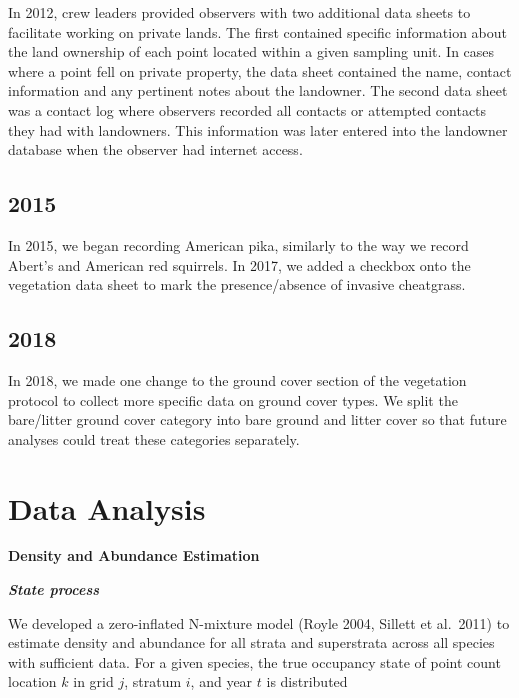 \documentclass[
  letterpaper,
  DIV=11,
  numbers=noendperiod,
  oneside]{scrreprt}
\begin{document}
In 2012, crew leaders provided observers with two additional data sheets
to facilitate working on private lands. The first contained specific
information about the land ownership of each point located within a
given sampling unit. In cases where a point fell on private property,
the data sheet contained the name, contact information and any pertinent
notes about the landowner. The second data sheet was a contact log where
observers recorded all contacts or attempted contacts they had with
landowners. This information was later entered into the landowner
database when the observer had internet access.

\hypertarget{section-15}{%
\section*{2015}\label{section-15}}


In 2015, we began recording American pika, similarly to the way we
record Abert's and American red squirrels. In 2017, we added a checkbox
onto the vegetation data sheet to mark the presence/absence of invasive
cheatgrass.

\hypertarget{section-16}{%
\section*{2018}\label{section-16}}


In 2018, we made one change to the ground cover section of the
vegetation protocol to collect more specific data on ground cover types.
We split the bare/litter ground cover category into bare ground and
litter cover so that future analyses could treat these categories
separately.

\hypertarget{data-analysis-1}{%
\chapter{Data Analysis}\label{data-analysis-1}}

\textbf{Density and Abundance Estimation}

\textbf{\emph{State process}}

We developed a zero-inflated N-mixture model (Royle 2004, Sillett et
al.~2011) to estimate density and abundance for all strata and
superstrata across all species with sufficient data. For a given
species, the true occupancy state of point count location \(k\) in grid
\(j\), stratum \(i\), and year \(t\) is distributed
\end{document}
